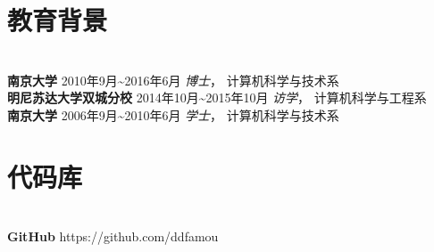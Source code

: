 \documentclass{res}[8.5pt]
\begin{document}
\begin{resume}
\section{{教育背景}}
\vspace{-12pt}
\hrulefill\\
{\bf 南京大学} \hfill  2010年9月\textasciitilde 2016年6月 \hspace{0.25in} 
{\sl 博士}， 计算机科学与技术系\\
{\bf 明尼苏达大学双城分校} \hfill 2014年10月\textasciitilde 2015年10月 \hspace{0.25in} 
{\sl 访学}， 计算机科学与工程系  \\
{\bf 南京大学}  \hfill 2006年9月\textasciitilde 2010年6月  \hspace{0.25in} 
{\sl 学士}， 计算机科学与技术系

\section{{代码库}}
\vspace{-12pt}
\hrulefill\\
{\bf GitHub} \hfill https://github.com/ddfamou

\end{resume}
\end{document}
